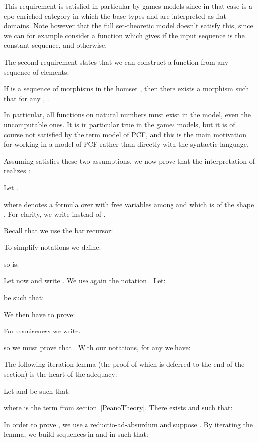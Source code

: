 \documentclass{CSML}
\begin{document}
\noindent This requirement is satisfied in particular by games models since in that case  is a cpo-enriched category in which the base types  and  are interpreted as flat domains. Note however that the full set-theoretic model doesn't satisfy this, since we can for example consider a function which gives  if the input sequence is the constant  sequence, and  otherwise.\par
The second requirement states that we can construct a function from any sequence of elements:
\begin{defi}
\label{sequence}
If  is a sequence of morphisms in the homset , then there exists a morphism  such that for any , .
\end{defi}
In particular, all functions on natural numbers must exist in the model, even the uncomputable ones. It is in particular true in the games models, but it is of course not satisfied by the term model of PCF, and this is the main motivation for working in a model of PCF rather than directly with the syntactic language.\par
Assuming  satisfies these two assumptions, we now prove that the interpretation of  realizes :
\begin{lem}
Let .

where  denotes a formula over  with free variables among  and which is of the shape . For clarity, we write  instead of .
\end{lem}
\proof
Recall that we use the bar recursor:

To simplify notations we define:

so  is:

Let now  and write . We use again the notation . Let:

be such that:

We then have to prove:

For conciseness we write:

so we must prove that . With our notations, for any  we have:

The following iteration lemma (the proof of which is deferred to the end of the section) is the heart of the adequacy:
\begin{lem}
Let  and  be such that:

where  is the term from section~\ref{PeanoTheory}. There exists  and  such that:
\smallskip
\end{lem}

\noindent In order to prove , we use a reductio-ad-absurdum and suppose . By iterating the lemma, we build sequences  in  and  in  such that:
\end{document}
